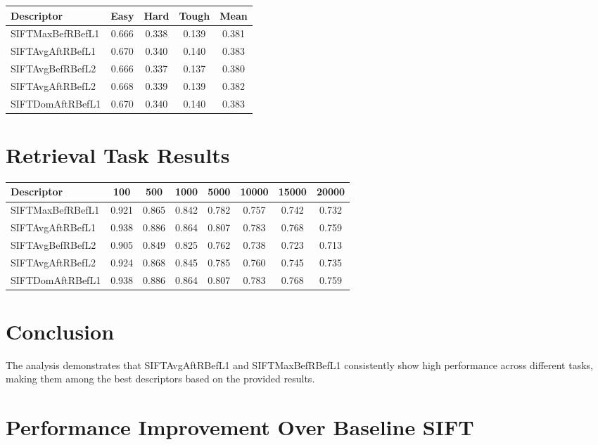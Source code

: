 \begin{tabular}{lcccc}
\toprule
\textbf{Descriptor} & \textbf{Easy} & \textbf{Hard} & \textbf{Tough} & \textbf{Mean} \\
\midrule
SIFTMaxBefRBefL1 & 0.666 & 0.338 & 0.139 & 0.381 \\
SIFTAvgAftRBefL1 & 0.670 & 0.340 & 0.140 & 0.383 \\
SIFTAvgBefRBefL2 & 0.666 & 0.337 & 0.137 & 0.380 \\
SIFTAvgAftRBefL2 & 0.668 & 0.339 & 0.139 & 0.382 \\
SIFTDomAftRBefL1 & 0.670 & 0.340 & 0.140 & 0.383 \\
\bottomrule
\end{tabular}

\section*{Retrieval Task Results}

\begin{tabularx}{\textwidth}{Xccccccc}
\toprule
\textbf{Descriptor} & \textbf{100} & \textbf{500} & \textbf{1000} & \textbf{5000} & \textbf{10000} & \textbf{15000} & \textbf{20000} \\
\midrule
SIFTMaxBefRBefL1 & 0.921 & 0.865 & 0.842 & 0.782 & 0.757 & 0.742 & 0.732 \\
SIFTAvgAftRBefL1 & 0.938 & 0.886 & 0.864 & 0.807 & 0.783 & 0.768 & 0.759 \\
SIFTAvgBefRBefL2 & 0.905 & 0.849 & 0.825 & 0.762 & 0.738 & 0.723 & 0.713 \\
SIFTAvgAftRBefL2 & 0.924 & 0.868 & 0.845 & 0.785 & 0.760 & 0.745 & 0.735 \\
SIFTDomAftRBefL1 & 0.938 & 0.886 & 0.864 & 0.807 & 0.783 & 0.768 & 0.759 \\
\bottomrule
\end{tabularx}

\section*{Conclusion}

The analysis demonstrates that SIFTAvgAftRBefL1 and SIFTMaxBefRBefL1 consistently show high performance across different tasks, making them among the best descriptors based on the provided results.

\section*{Performance Improvement Over Baseline SIFT}

